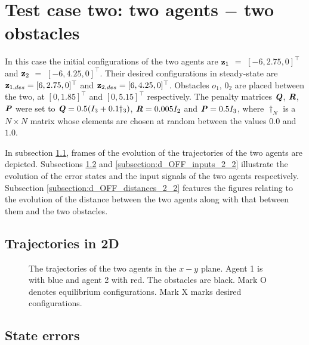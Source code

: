 \section{Test case two: two agents $-$ two obstacles}

In this case the initial configurations of the two agents are
$\bm{\mathbf{z}}_1$ $=$ $[-6, 2.75, 0]^{\top}$ and
$\bm{\mathbf{z}}_2$ $=$ $[-6, 4.25, 0]^{\top}$.
Their desired configurations in steady-state are
$\bm{\mathbf{z}}_{1,des} = [6, 2.75, 0]^{\top}$ and
$\bm{\mathbf{z}}_{2,des} = [6, 4.25, 0]^{\top}$.
Obstacles $o_1$, $0_2$ are placed between the two, at $[0, 1.85]^{\top}$
and $[0, 5.15]^{\top}$ respectively. The penalty
matrices $\bm{\mathit{Q}}$, $\bm{\mathit{R}}$, $\bm{\mathit{P}}$ were set to
$\bm{\mathit{Q}} = 0.5 (I_3 + 0.1 \dagger_3)$, $\bm{\mathit{R}} = 0.005 I_2$ and
$\bm{\mathit{P}} = 0.5 I_3$, where $\dagger_N$ is a $N \times N$ matrix whose
elements are chosen at random between the values $0.0$ and $1.0$.

In subsection \ref{subsection:d_OFF_trajectories_2_2}, frames of the evolution of the
trajectories of the two agents are depicted. Subsections
\ref{subsection:d_OFF_errors_2_2} and \ref{subsection:d_OFF_inputs_2_2} illustrate
the evolution of the error states and the input signals of the two agents
respectively. Subsection \ref{subsection:d_OFF_distances_2_2} features the
figures relating to the evolution of the distance between the two agents
along with that between them and the two obstacles.


\subsection{Trajectories in 2D}
\label{subsection:d_OFF_trajectories_2_2}

\begin{figure}[H]
  \scalebox{0.9}{}
  \caption{The trajectories of the two agents in the $x-y$ plane. Agent 1 is with
    blue and agent 2 with red. The obstacles are black. Mark O denotes equilibrium
    configurations. Mark X marks desired configurations.}
  \label{fig:d_OFF_trajectory_2_2}
\end{figure}


\subsection{State errors}
\label{subsection:d_OFF_errors_2_2}

